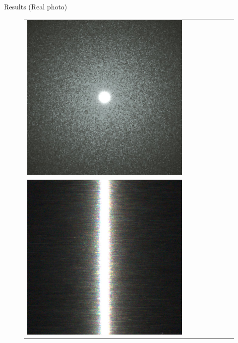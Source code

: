 \documentclass[final]{beamer}
\newlength{\twocolwid}
\newlength{\resultwidth}
\begin{document}
\begin{frame}[t]
\begin{columns}[t]
\begin{column}{\twocolwid}
\begin{block}{Results (Real photo)}
\begin{figure}[t]
\begin{tabular}{ccrclccc}
            		\includegraphics[width=\resultwidth]{real/flake/bad1.jpg}
            		\\
            		\includegraphics[width=\resultwidth]{real/metal/target.jpg} &

\end{tabular}
\end{figure}
\end{block}
\end{column}
\end{columns}
\end{frame}
\end{document}
